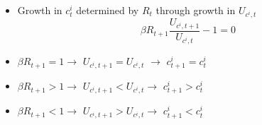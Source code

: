 \documentclass[notes=show]{beamer}
\begin{document}
\begin{frame}%


\begin{itemize}
\item Growth in $c_{t}^{i}$ determined by $R_{t}$ through growth in $%
U_{c^{i},t}$%
\begin{equation*}
\beta R_{t+1}\frac{U_{c^{i},t+1}}{U_{c^{i},t}}-1=0
\end{equation*}

\item $\beta R_{t+1}=1\rightarrow $ $U_{c^{i},t+1}=U_{c^{i},t}$ $\rightarrow 
$ $c_{t+1}^{i}=c_{t}^{i}$

\item $\beta R_{t+1}>1\rightarrow $ $U_{c^{i},t+1}<U_{c^{i},t}\rightarrow $ $%
c_{t+1}^{i}>c_{t}^{i}$

\item $\beta R_{t+1}<1\rightarrow $ $U_{c^{i},t+1}>U_{c^{i},t}\rightarrow $ $%
c_{t+1}^{i}<c_{t}^{i}$
\end{itemize}

\transboxout%
\end{frame}%
\end{document}
